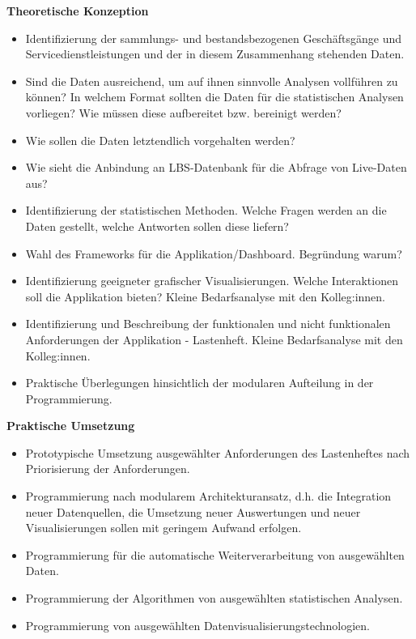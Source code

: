 \documentclass[10pt,a4paper,twocolumn,report]{IEEEtran}
\begin{document}
\textbf{Theoretische Konzeption}\\
\begin{itemize}
    \item Identifizierung der sammlungs- und bestandsbezogenen Geschäftsgänge und Servicedienstleistungen und der in diesem Zusammenhang stehenden Daten.
    \item Sind die Daten ausreichend, um auf ihnen sinnvolle Analysen vollführen zu
          können? In welchem Format sollten die Daten für die statistischen
          Analysen vorliegen? Wie müssen diese aufbereitet bzw. bereinigt werden?
    \item Wie sollen die Daten letztendlich vorgehalten werden?
    \item Wie sieht die Anbindung an LBS-Datenbank für die Abfrage von Live-Daten
          aus?
    \item Identifizierung der statistischen Methoden. Welche Fragen werden an die Daten
          gestellt, welche Antworten sollen diese liefern?
    \item Wahl des Frameworks für die Applikation/Dashboard. Begründung warum?
    \item Identifizierung geeigneter grafischer Visualisierungen. Welche
          Interaktionen soll die Applikation bieten? Kleine Bedarfsanalyse mit den Kolleg:innen.
    \item Identifizierung und Beschreibung der funktionalen und nicht funktionalen
          Anforderungen der Applikation - Lastenheft. Kleine Bedarfsanalyse mit den Kolleg:innen.
    \item Praktische Überlegungen hinsichtlich der modularen Aufteilung in der
          Programmierung.\\
\end{itemize}


\textbf{Praktische Umsetzung}\\
\begin{itemize}
    \item Prototypische Umsetzung ausgewählter Anforderungen des Lastenheftes nach Priorisierung der Anforderungen.
    \item Programmierung nach modularem Architekturansatz, d.h. die Integration neuer Datenquellen, die Umsetzung neuer Auswertungen und neuer Visualisierungen
					sollen mit geringem Aufwand erfolgen.
    \item Programmierung für die automatische Weiterverarbeitung von ausgewählten Daten.
    \item Programmierung der Algorithmen von ausgewählten statistischen Analysen.
    \item Programmierung von ausgewählten Datenvisualisierungstechnologien.
\end{itemize}



\end{document}
